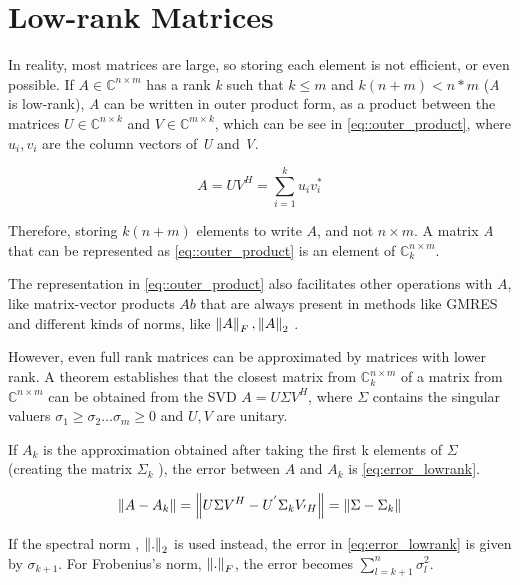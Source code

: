 
\section{Low-rank Matrices}

In reality, most matrices are large, so storing each element is not efficient, or even possible. If $A \in \mathbb{C}^{n\times m}$ has a rank \textit{k} such that $k \leq m$ and $k(n+m) < n*m$ (\textit{A} is low-rank), \textit{A} can be written in outer product form, as a product between the matrices $U \in \mathbb{C}^{n\times k} $ and $V \in \mathbb{C}^{m\times k}$, which can be see in \ref{eq::outer_product}, where $u_{i}, v_{i}$ are the column vectors of \textit{U} and \textit{V}.

\begin{equation}\label{eq::outer_product}
    A = UV^{H} = \sum_{i=1} ^{k} u_{i} v_{i} ^{*}
\end{equation}


Therefore, storing $k(n+m)$ elements to write $A$, and not $n\times m$. A matrix \textit{A} that can be represented as \ref{eq::outer_product} is an element of $\mathbb{C}^{n\times m}_{k}$.

The representation in \ref{eq::outer_product} also facilitates other operations with $A$, like matrix-vector products $Ab$ that are always present in methods like GMRES \cite{bebendorf2008hierarchical} and different kinds of norms, like $\left\lVert A\right\rVert_{F}, \left\lVert A\right\rVert_{2}$ \cite{bebendorf2008hierarchical}.

However, even full rank matrices can be approximated by matrices with lower rank. A theorem \cite{bebendorf2008hierarchical} establishes that the closest matrix from $\mathbb{C}^{n\times m}_{k}$ of a matrix from $\mathbb{C}^{n\times m}$ can be obtained from the SVD $A = U \Sigma V^{H}$, where $\Sigma$ contains the singular valuers $\sigma_{1} \geq \sigma_{2} \dots \sigma_{m} \geq 0$ and $U,V$ are unitary.

If $ A_{k} $ is the approximation obtained after taking the first k elements of $\Sigma$ (creating the matrix $ \Sigma_{k} $ ), the error between $ A $ and $ A_{k} $ is \ref{eq:error_lowrank}.

\begin{equation}\label{eq:error_lowrank}
    \left\lVert A-A_{k}\right\rVert = \left\lVert U\Sigma V^{H} - U^{'} \Sigma_{k} V_{' H}\right\rVert = \left\lVert\Sigma - \Sigma_{k}\right\rVert
\end{equation}

If the spectral norm , $\left\lVert.\right\rVert_{2} $ is used instead, the error in \ref{eq:error_lowrank} is given by $\sigma_{k+1}$. For Frobenius's norm, $\left\lVert.\right\rVert_{F}$, the error becomes $\sum^{n}_{l=k+1} \sigma^{2}_{l}$.

